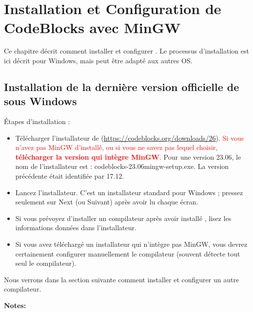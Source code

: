 ﻿\chapter{Installation et Configuration de CodeBlocks avec MinGW}\label{sec:install_codeblocks}

Ce chapitre décrit comment installer et configurer \codeblocks. Le processus d'installation est ici décrit pour Windows, mais peut être adapté aux autres OS.

\section{Installation de la dernière version officielle de \codeblocks sous Windows}

Étapes d'installation :
\begin{itemize}
\item Télécharger l'installateur de \codeblocks (\url{https://codeblocks.org/downloads/26}). \textcolor{red}{Si vous n'avez pas MinGW d'installé, ou si vous ne savez pas lequel choisir, \textbf{télécharger la version qui intègre MinGW}}. Pour une version 23.06, le nom de l'installateur est : codeblocks-23.06mingw-setup.exe. La version précédente était identifiée par 17.12.
\item Lancez l'installateur. C'est un installateur standard pour Windows ; pressez seulement sur Next (ou Suivant) après avoir lu chaque écran.
\item Si vous prévoyez d'installer un compilateur après avoir installé \codeblocks, lisez les informations données dans l'installateur.
\item Si vous avez téléchargé un installateur qui n'intègre pas MinGW, vous devrez certainement configurer manuellement le compilateur (souvent \codeblocks détecte tout seul le compilateur).
\end{itemize}

Nous verrons dans la section suivante comment installer et configurer un autre compilateur.

\textbf{Notes:}

